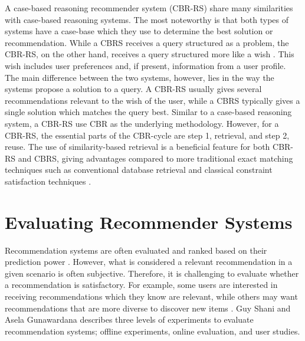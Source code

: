 A case-based reasoning recommender system (CBR-RS) share many similarities with case-based reasoning systems. The most noteworthy is that both types of systems have a case-base which they use to determine the best solution or recommendation. While a CBRS receives a query structured as a problem, the CBR-RS, on the other hand, receives a query structured more like a wish \cite{richter2013case}. This wish includes user preferences and, if present, information from a user profile. The main difference between the two systems, however, lies in the way the systems propose a solution to a query. A CBR-RS usually gives several recommendations relevant to the wish of the user, while a CBRS typically gives a single solution which matches the query best. Similar to a case-based reasoning system, a CBR-RS use CBR as the underlying methodology. However, for a CBR-RS, the essential parts of the CBR-cycle are step 1, retrieval, and step 2, reuse. The use of similarity-based retrieval is a beneficial feature for both CBR-RS and CBRS, giving advantages compared to more traditional exact matching techniques such as conventional database retrieval and classical constraint satisfaction techniques \cite{bridge2005case}.

\section{Evaluating Recommender Systems}

Recommendation systems are often evaluated and ranked based on their prediction power \cite{shani2011evaluating}. However, what is considered a relevant recommendation in a given scenario is often subjective. Therefore, it is challenging to evaluate whether a recommendation is satisfactory. For example, some users are interested in receiving recommendations which they know are relevant, while others may want recommendations that are more diverse to discover new items \cite{shani2011evaluating}. Guy Shani and Asela Gunawardana \cite{shani2011evaluating} describes three levels of experiments to evaluate recommendation systems; offline experiments, online evaluation, and user studies.

